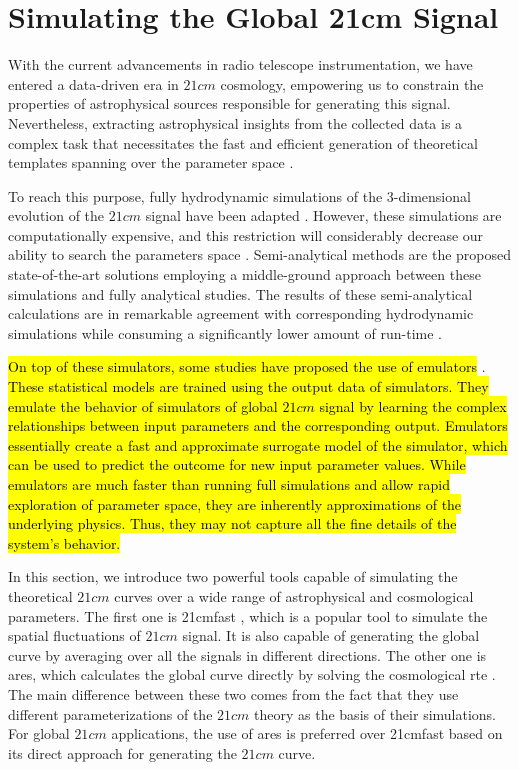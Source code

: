 \documentclass[12pt, TexShade, letterpaper]{report}
\begin{document}
\section{Simulating the Global 21cm Signal}
With the current advancements in radio telescope instrumentation, we have entered a data-driven era in $21cm$ cosmology, empowering us to constrain the properties of astrophysical sources responsible for generating this signal. Nevertheless, extracting astrophysical insights from the collected data is a complex task that necessitates the fast and efficient generation of theoretical templates spanning over the parameter space \cite{emulate_21cm}. \par
To reach this purpose, fully hydrodynamic simulations of the 3-dimensional evolution of the $21cm$ signal have been adapted \cite{hydrodynamic_sim}. However, these simulations are computationally expensive, and this restriction will considerably decrease our ability to search the parameters space \cite{ares2014jordan}. 
Semi-analytical methods are the proposed state-of-the-art solutions employing a middle-ground approach between these simulations and fully analytical studies. The results of these semi-analytical calculations are in remarkable agreement with corresponding hydrodynamic simulations while consuming a significantly lower amount of run-time \cite{semi_analytic_1, semi_analytic_2, semi_analytic_3, semi_analytic_4, semi-analytic_5}. \par
\hl{On top of these simulators, some studies have proposed the use of emulators} \cite{emulate_21cm, emulate_21cm_2, emulate_21cm_3}. \hl{These statistical models are trained using the output data of simulators. They emulate the behavior of simulators of global $21cm$ signal by learning the complex relationships between input parameters and the corresponding output. Emulators essentially create a fast and approximate surrogate model of the simulator, which can be used to predict the outcome for new input parameter values. While emulators are much faster than running full simulations and allow rapid exploration of parameter space, they are inherently approximations of the underlying physics. Thus, they may not capture all the fine details of the system's behavior.}\par
In this section, we introduce two powerful tools capable of simulating the theoretical $21cm$ curves over a wide range of astrophysical and cosmological parameters. The first one is \gls{21cmfast} \cite{21cmfast_c, 21cmfast_python}, which is a popular tool to simulate the spatial fluctuations of $21cm$ signal. It is also capable of generating the global curve by averaging over all the signals in different directions. The other one is \gls{ares}, which calculates the global curve directly by solving the cosmological \gls{rte} \cite{ares2014jordan}. The main difference between these two comes from the fact that they use different parameterizations of the $21cm$ theory as the basis of their simulations. For global $21cm$ applications, the use of \gls{ares} is preferred over \gls{21cmfast} based on its direct approach for generating the $21cm$ curve. \par
\end{document}
